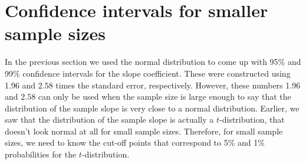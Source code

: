 \documentclass[]{report}\usepackage[]{graphicx}\usepackage[]{color}
\begin{document}
\section{Confidence intervals for smaller sample sizes}

In the previous section we used the normal distribution to come up with 95\% and 99\% confidence intervals for the slope coefficient. These were constructed using 1.96 and $2.58$ times the standard error, respectively. However, these numbers 1.96 and $2.58$ can only be used when the sample size is large enough to say that the distribution of the sample slope is very close to a normal distribution. Earlier, we saw that the distribution of the sample slope is actually a $t$-distribution, that doesn't look normal at all for small sample sizes. Therefore, for small sample sizes, we need to know the cut-off points that correspond to 5\% and 1\% probabilities for the $t$-distribution.









\end{document}

